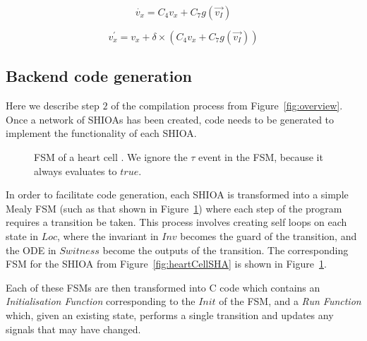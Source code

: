 \begin{equation}
\dot{v_x} = C_{4} v_x + C_{7} g(\vec{v_{I}})
\label{eq:ode}
\end{equation}

\begin{equation}
v^\prime_x = v_x + \delta \times (C_{4} v_x + C_{7} g(\vec{v_{I}}))
\label{eq:euler_equiv}
\end{equation}


\subsection{Backend code generation}
\label{sec:backendCodeGeneration}

Here we describe step $2$ of the compilation process from
Figure~\ref{fig:overview}. Once a network of \acp{SHIOA} has been
created, code needs to be generated to implement the functionality of
each \ac{SHIOA}.

\begin{figure}
  \centering
  
  \caption{\acf{FSM} of a heart cell \label{fig:heartCellFSM}. We ignore
    the $\tau$ event in the FSM, because it always evaluates to $true$.}
\end{figure}

In order to facilitate code generation, each \ac{SHIOA} is transformed
into a simple Mealy \ac{FSM} (such as that shown in
Figure~\ref{fig:heartCellFSM}) where each step of the program requires a
transition be taken.  This process involves creating self loops on each
state in $Loc$, where the invariant in $Inv$ becomes the guard of the
transition, and the \acs{ODE} in $Switness$ become the outputs of the
transition.  The corresponding \ac{FSM} for the \ac{SHIOA} from
Figure~\ref{fig:heartCellSHA} is shown in Figure~\ref{fig:heartCellFSM}.

Each of these \acp{FSM} are then transformed into C code which contains
an \emph{Initialisation Function} corresponding to the $Init$ of the
\ac{FSM}, and a \emph{Run Function} which, given an existing state,
performs a single transition and updates any signals that may have
changed.



